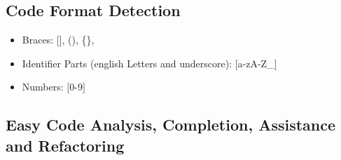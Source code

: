\documentclass[a4paper,10pt,twocolumn]{article}
\begin{document}
\subsection{Code Format Detection}

\begin{itemize}
\item Braces: \mbox{$[$}\mbox{$]$}, (), \{\},

\item Identifier Parts (english Letters and underscore):
  \mbox{$[$}a-zA-Z\_\mbox{$]$}
\item Numbers: \mbox{$[$}0-9\mbox{$]$}
\end{itemize}

\subsection{Easy Code Analysis, Completion, Assistance and Refactoring}
\end{document}
